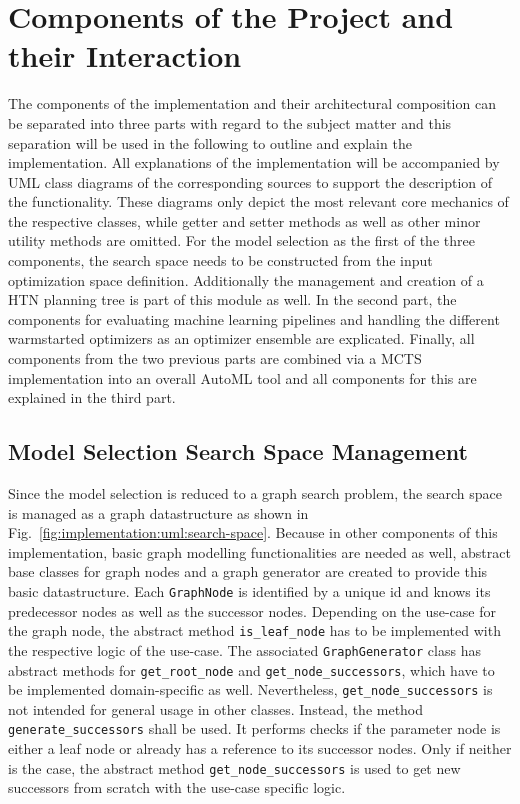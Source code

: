 \section{Components of the Project and their Interaction}
\label{sec:implementation:components}
The components of the implementation and their architectural composition can be separated into three parts with regard to the subject matter and this separation will be used in the following to outline and explain the implementation.
All explanations of the implementation will be accompanied by UML class diagrams of the corresponding sources to support the description of the functionality.
These diagrams only depict the most relevant core mechanics of the respective classes, while getter and setter methods as well as other minor utility methods are omitted.\newline 
For the model selection as the first of the three components, the search space needs to be constructed from the input optimization space definition.
Additionally the management and creation of a HTN planning tree is part of this module as well.\newline
In the second part, the components for evaluating machine learning pipelines and handling the different warmstarted optimizers as an optimizer ensemble are explicated.\newline
Finally, all components from the two previous parts are combined via a MCTS implementation into an overall AutoML tool and all components for this are explained in the third part.

\subsection{Model Selection Search Space Management}
\label{sec:implementation:components:search-space}
Since the model selection is reduced to a graph search problem, the search space is managed as a graph datastructure as shown in Fig.~\ref{fig:implementation:uml:search-space}.
Because in other components of this implementation, basic graph modelling functionalities are needed as well, abstract base classes for graph nodes and a graph generator are created to provide this basic datastructure.\newline
Each \texttt{GraphNode} is identified by a unique id and knows its predecessor nodes as well as the successor nodes.
Depending on the use-case for the graph node, the abstract method \texttt{is\_leaf\_node} has to be implemented with the respective logic of the use-case.\newline
The associated \texttt{GraphGenerator} class has abstract methods for \texttt{get\_root\_node} and \texttt{get\_node\_successors}, which have to be implemented domain-specific as well.
Nevertheless, \texttt{get\_node\_successors} is not intended for general usage in other classes.
Instead, the method \texttt{generate\_successors} shall be used.
It performs checks if the parameter node is either a leaf node or already has a reference to its successor nodes.
Only if neither is the case, the abstract method \texttt{get\_node\_successors} is used to get new successors from scratch with the use-case specific logic.

